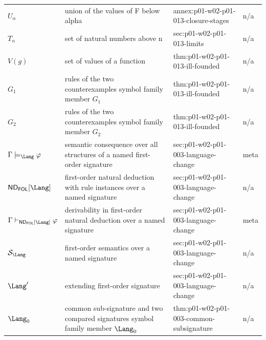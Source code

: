 \begin{longtable}{@{}p{}p{}p{}p{}@{}}
\(U_\alpha\) & union of the values of F below alpha & annex:\allowbreak{}p01-\allowbreak{}w02-\allowbreak{}p01-\allowbreak{}013-\allowbreak{}closure-\allowbreak{}stages & n/a \\
\(T_n\) & set of natural numbers above n & sec:\allowbreak{}p01-\allowbreak{}w02-\allowbreak{}p01-\allowbreak{}013-\allowbreak{}limits & n/a \\
\(V(g)\) & set of values of a function & thm:\allowbreak{}p01-\allowbreak{}w02-\allowbreak{}p01-\allowbreak{}013-\allowbreak{}ill-\allowbreak{}founded & n/a \\
\(G_1\) & rules of the two counterexamples symbol family member \(G_1\) & thm:\allowbreak{}p01-\allowbreak{}w02-\allowbreak{}p01-\allowbreak{}013-\allowbreak{}ill-\allowbreak{}founded & n/a \\
\(G_2\) & rules of the two counterexamples symbol family member \(G_2\) & thm:\allowbreak{}p01-\allowbreak{}w02-\allowbreak{}p01-\allowbreak{}013-\allowbreak{}ill-\allowbreak{}founded & n/a \\
\(\Gamma\models_{\Lang}\varphi\) & semantic consequence over all structures of a named first-order signature & sec:\allowbreak{}p01-\allowbreak{}w02-\allowbreak{}p01-\allowbreak{}003-\allowbreak{}language-\allowbreak{}change & meta \\
\(\mathsf{ND}_{\mathsf{FOL}}[\Lang]\) & first-order natural deduction with rule instances over a named signature & sec:\allowbreak{}p01-\allowbreak{}w02-\allowbreak{}p01-\allowbreak{}003-\allowbreak{}language-\allowbreak{}change & n/a \\
\(\Gamma\vdash_{\mathsf{ND}_{\mathsf{FOL}}[\Lang]}\varphi\) & derivability in first-order natural deduction over a named signature & sec:\allowbreak{}p01-\allowbreak{}w02-\allowbreak{}p01-\allowbreak{}003-\allowbreak{}language-\allowbreak{}change & meta \\
\(\mathcal S_{\Lang}\) & first-order semantics over a named signature & sec:\allowbreak{}p01-\allowbreak{}w02-\allowbreak{}p01-\allowbreak{}003-\allowbreak{}language-\allowbreak{}change & n/a \\
\(\Lang'\) & extending first-order signature & sec:\allowbreak{}p01-\allowbreak{}w02-\allowbreak{}p01-\allowbreak{}003-\allowbreak{}language-\allowbreak{}change & n/a \\
\(\Lang_0\) & common sub-signature and two compared signatures symbol family member \(\Lang_0\) & thm:\allowbreak{}p01-\allowbreak{}w02-\allowbreak{}p01-\allowbreak{}003-\allowbreak{}common-\allowbreak{}subsignature & n/a \\

\end{longtable}

